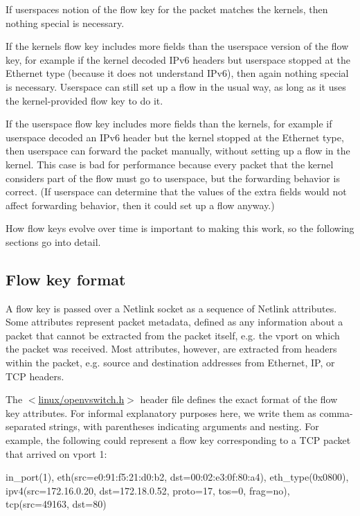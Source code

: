 \begin{DoxyItemize}
\item If userspace\textquotesingle{}s notion of the flow key for the packet matches the kernel\textquotesingle{}s, then nothing special is necessary.
\item If the kernel\textquotesingle{}s flow key includes more fields than the userspace version of the flow key, for example if the kernel decoded I\+Pv6 headers but userspace stopped at the Ethernet type (because it does not understand I\+Pv6), then again nothing special is necessary. Userspace can still set up a flow in the usual way, as long as it uses the kernel-\/provided flow key to do it.
\item If the userspace flow key includes more fields than the kernel\textquotesingle{}s, for example if userspace decoded an I\+Pv6 header but the kernel stopped at the Ethernet type, then userspace can forward the packet manually, without setting up a flow in the kernel. This case is bad for performance because every packet that the kernel considers part of the flow must go to userspace, but the forwarding behavior is correct. (If userspace can determine that the values of the extra fields would not affect forwarding behavior, then it could set up a flow anyway.)
\end{DoxyItemize}

How flow keys evolve over time is important to making this work, so the following sections go into detail.

\subsection*{Flow key format }

A flow key is passed over a Netlink socket as a sequence of Netlink attributes. Some attributes represent packet metadata, defined as any information about a packet that cannot be extracted from the packet itself, e.\+g. the vport on which the packet was received. Most attributes, however, are extracted from headers within the packet, e.\+g. source and destination addresses from Ethernet, I\+P, or T\+C\+P headers.

The $<$\hyperlink{openvswitch_8h}{linux/openvswitch.\+h}$>$ header file defines the exact format of the flow key attributes. For informal explanatory purposes here, we write them as comma-\/separated strings, with parentheses indicating arguments and nesting. For example, the following could represent a flow key corresponding to a T\+C\+P packet that arrived on vport 1\+: \begin{DoxyVerb}in_port(1), eth(src=e0:91:f5:21:d0:b2, dst=00:02:e3:0f:80:a4),
eth_type(0x0800), ipv4(src=172.16.0.20, dst=172.18.0.52, proto=17, tos=0,
frag=no), tcp(src=49163, dst=80)
\end{DoxyVerb}


